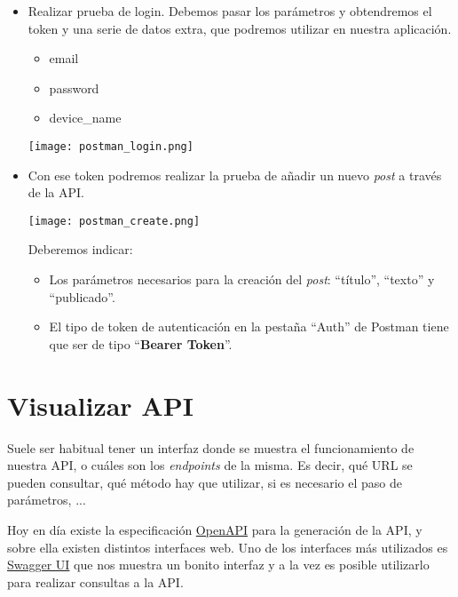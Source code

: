 \begin{itemize}
    \item Realizar prueba de login. Debemos pasar los parámetros y obtendremos el token y una serie de datos extra, que podremos utilizar en nuestra aplicación.
    \begin{itemize}
        \item email
        \item password
        \item device\_name
    \end{itemize}

    \begin{center}
        \texttt{[image: postman\_login.png]}
    \end{center}

    \item Con ese token podremos realizar la prueba de añadir un nuevo \textit{post} a través de la API.

    \begin{center}
        \texttt{[image: postman\_create.png]}
    \end{center}

    Deberemos indicar:

    \begin{itemize}
        \item Los parámetros necesarios para la creación del \textit{post}: “título”, “texto” y “publicado”.
        \item El tipo de token de autenticación en la pestaña “Auth” de Postman tiene que ser de tipo “\textbf{Bearer Token}”.
    \end{itemize}

\end{itemize}


\chapter{Visualizar API}

Suele ser habitual tener un interfaz donde se muestra el funcionamiento de nuestra API, o cuáles son los \textit{endpoints} de la misma. Es decir, qué URL se pueden consultar, qué método hay que utilizar, si es necesario el paso de parámetros, ...

Hoy en día existe la especificación \href{https://www.openapis.org/}{OpenAPI} para la generación de la API, y sobre ella existen distintos interfaces web. Uno de los interfaces más utilizados es \href{https://swagger.io/tools/swagger-ui/}{Swagger UI} que nos muestra un bonito interfaz y a la vez es posible utilizarlo para realizar consultas a la API.

